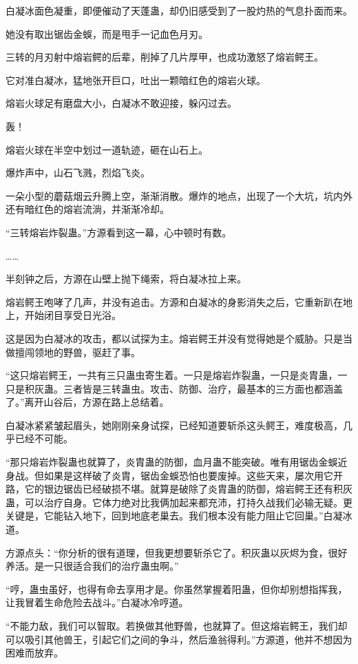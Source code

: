 \begin{this_body}
白凝冰面色凝重，即便催动了天蓬蛊，却仍旧感受到了一股灼热的气息扑面而来。

她没有取出锯齿金蜈，而是甩手一记血色月刃。

三转的月刃射中熔岩鳄的后辈，削掉了几片厚甲，也成功激怒了熔岩鳄王。

它对准白凝冰，猛地张开巨口，吐出一颗暗红色的熔岩火球。

熔岩火球足有磨盘大小，白凝冰不敢迎接，躲闪过去。

轰！

熔岩火球在半空中划过一道轨迹，砸在山石上。

爆炸声中，山石飞溅，烈焰飞炎。

一朵小型的蘑菇烟云升腾上空，渐渐消散。爆炸的地点，出现了一个大坑，坑内外还有暗红色的熔岩流淌，并渐渐冷却。

“三转熔岩炸裂蛊。”方源看到这一幕，心中顿时有数。

……

半刻钟之后，方源在山壁上抛下绳索，将白凝冰拉上来。

熔岩鳄王咆哮了几声，并没有追击。方源和白凝冰的身影消失之后，它重新趴在地上，开始闭目享受日光浴。

这是因为白凝冰的攻击，都以试探为主。熔岩鳄王并没有觉得她是个威胁。只是当做擅闯领地的野兽，驱赶了事。

“这只熔岩鳄王，一共有三只蛊虫寄生着。一只是熔岩炸裂蛊，一只是炎胄蛊，一只是积灰蛊。三者皆是三转蛊虫。攻击、防御、治疗，最基本的三方面也都涵盖了。”离开山谷后，方源在路上总结着。

白凝冰紧紧皱起眉头，她刚刚亲身试探，已经知道要斩杀这头鳄王，难度极高，几乎已经不可能。

“那只熔岩炸裂蛊也就算了，炎胄蛊的防御，血月蛊不能突破。唯有用锯齿金蜈近身战。但如果是这样破了炎胄，锯齿金蜈恐怕也要废掉。这些天来，屡次用它开路，它的银边锯齿已经破损不堪。就算是破除了炎胄蛊的防御，熔岩鳄王还有积灰蛊，可以治疗自身。它体力绝对比我俩加起来都充沛，打持久战我们必输无疑。更关键是，它能钻入地下，回到地底老巢去。我们根本没有能力阻止它回巢。”白凝冰道。

方源点头：“你分析的很有道理，但我更想要斩杀它了。积灰蛊以灰烬为食，很好养活。是一只很适合我们的治疗蛊虫啊。”

“哼，蛊虫虽好，也得有命去享用才是。你虽然掌握着阳蛊，但你却别想指挥我，让我冒着生命危险去战斗。”白凝冰冷哼道。

“不能力敌，我们可以智取。若换做其他野兽，也就算了。但这熔岩鳄王，我们却可以吸引其他兽王，引起它们之间的争斗，然后渔翁得利。”方源道，他并不想因为困难而放弃。


\end{this_body}
